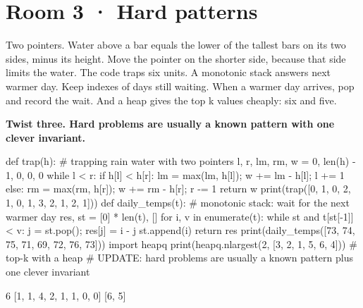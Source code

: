\documentclass[11pt,a4paper]{report}
\begin{document}
\section*{Room 3 · Hard patterns}
Two pointers. Water above a bar equals the lower of the tallest bars on its two sides, minus its height. Move the pointer on the shorter side, because that side limits the water. The code traps six units. A monotonic stack answers next warmer day. Keep indexes of days still waiting. When a warmer day arrives, pop and record the wait. And a heap gives the top k values cheaply: six and five.
\begin{tcolorbox}[colback=yellow!12,colframe=orange!70!black,boxrule=0.4pt,left=4pt,right=4pt,top=2pt,bottom=2pt]\textbf{Twist three. Hard problems are usually a known pattern with one clever invariant.}\end{tcolorbox}
\begin{Code}
def trap(h):                                # trapping rain water with two pointers
    l, r, lm, rm, w = 0, len(h) - 1, 0, 0, 0
    while l < r:
        if h[l] < h[r]: lm = max(lm, h[l]); w += lm - h[l]; l += 1
        else: rm = max(rm, h[r]); w += rm - h[r]; r -= 1
    return w
print(trap([0, 1, 0, 2, 1, 0, 1, 3, 2, 1, 2, 1]))
def daily_temps(t):                         # monotonic stack: wait for the next warmer day
    res, st = [0] * len(t), []
    for i, v in enumerate(t):
        while st and t[st[-1]] < v: j = st.pop(); res[j] = i - j
        st.append(i)
    return res
print(daily_temps([73, 74, 75, 71, 69, 72, 76, 73]))
import heapq
print(heapq.nlargest(2, [3, 2, 1, 5, 6, 4]))   # top-k with a heap
# UPDATE: hard problems are usually a known pattern plus one clever invariant
\end{Code}
\begin{Out}
6
[1, 1, 4, 2, 1, 1, 0, 0]
[6, 5]
\end{Out}
\end{document}
